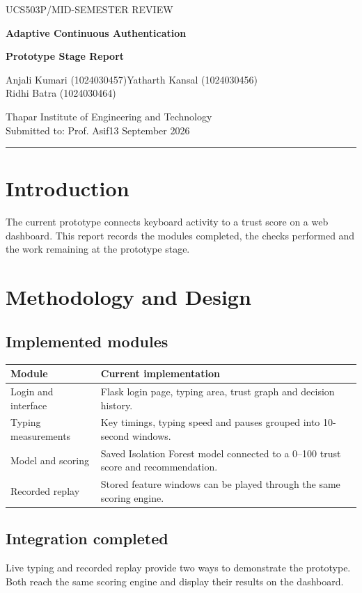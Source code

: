 \documentclass[11pt,a4paper]{article}
\begin{document}
{\small\sffamily\color{teal} UCS503P\quad /\quad MID-SEMESTER REVIEW}\par
{\LARGE\bfseries\color{navy} Adaptive Continuous Authentication}\par
{\Large\bfseries Prototype Stage Report}\par
\vspace{2pt}
Anjali Kumari (1024030457)\quad Yatharth Kansal (1024030456)\\
Ridhi Batra (1024030464)\par
{\small Thapar Institute of Engineering and Technology\\
Submitted to: Prof. Asif\hspace{1em}13 September 2026}\par
{\color{teal}\rule{\linewidth}{0.8pt}}

\section{Introduction}
The current prototype connects keyboard activity to a trust score on a web dashboard. This report records the modules completed, the checks performed and the work remaining at the prototype stage.

\section{Methodology and Design}
\subsection*{Implemented modules}
\renewcommand{\arraystretch}{1.2}
\begin{tabular}{@{}>{\raggedright\arraybackslash}p{3.2cm}>{\raggedright\arraybackslash}p{12.6cm}@{}}
\hline
\textbf{Module} & \textbf{Current implementation}\\
\hline
Login and interface & Flask login page, typing area, trust graph and decision history.\\
Typing measurements & Key timings, typing speed and pauses grouped into 10-second windows.\\
Model and scoring & Saved Isolation Forest model connected to a 0--100 trust score and recommendation.\\
Recorded replay & Stored feature windows can be played through the same scoring engine.\\
\hline
\end{tabular}

\subsection*{Integration completed}
Live typing and recorded replay provide two ways to demonstrate the prototype. Both reach the same scoring engine and display their results on the dashboard.
\end{document}
